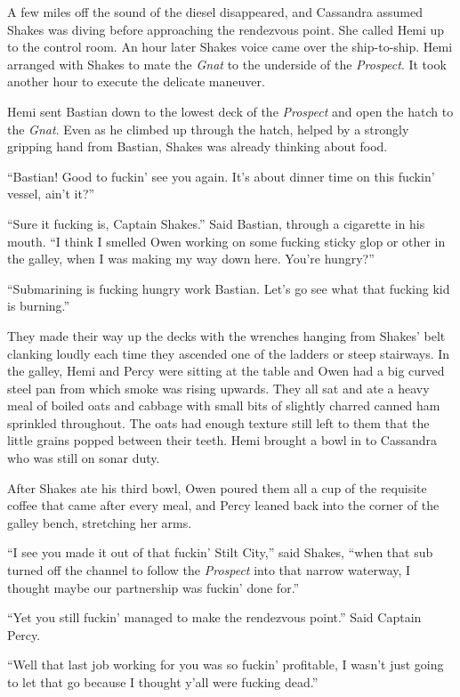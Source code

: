 \documentclass[]{scrbook}
\begin{document}
A few miles off the sound of the diesel disappeared, and Cassandra
assumed Shakes was diving before approaching the rendezvous point. She
called Hemi up to the control room. An hour later Shakes voice came over
the ship-to-ship. Hemi arranged with Shakes to mate the \emph{Gnat} to
the underside of the \emph{Prospect}. It took another hour to execute
the delicate maneuver.

Hemi sent Bastian down to the lowest deck of the \emph{Prospect} and
open the hatch to the \emph{Gnat}. Even as he climbed up through the
hatch, helped by a strongly gripping hand from Bastian, Shakes was
already thinking about food.

``Bastian! Good to fuckin' see you again. It's about dinner time on this
fuckin' vessel, ain't it?''

``Sure it fucking is, Captain Shakes.'' Said Bastian, through a
cigarette in his mouth. ``I think I smelled Owen working on some fucking
sticky glop or other in the galley, when I was making my way down here.
You're hungry?''

``Submarining is fucking hungry work Bastian. Let's go see what that
fucking kid is burning.''

They made their way up the decks with the wrenches hanging from Shakes'
belt clanking loudly each time they ascended one of the ladders or steep
stairways. In the galley, Hemi and Percy were sitting at the table and
Owen had a big curved steel pan from which smoke was rising upwards.
They all sat and ate a heavy meal of boiled oats and cabbage with small
bits of slightly charred canned ham sprinkled throughout. The oats had
enough texture still left to them that the little grains popped between
their teeth. Hemi brought a bowl in to Cassandra who was still on sonar
duty.

After Shakes ate his third bowl, Owen poured them all a cup of the
requisite coffee that came after every meal, and Percy leaned back into
the corner of the galley bench, stretching her arms.

``I see you made it out of that fuckin' Stilt City,'' said Shakes,
``when that sub turned off the channel to follow the \emph{Prospect}
into that narrow waterway, I thought maybe our partnership was fuckin'
done for.''

``Yet you still fuckin' managed to make the rendezvous point.'' Said
Captain Percy.

``Well that last job working for you was so fuckin' profitable, I wasn't
just going to let that go because I thought y'all were fucking dead.''
\end{document}
